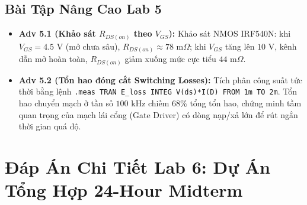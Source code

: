 \documentclass[12pt,a4paper]{report}
\begin{document}
\section{Bài Tập Nâng Cao Lab 5}
\begin{itemize}
    \item \textbf{Adv 5.1 (Khảo sát $R_{DS(on)}$ theo $V_{GS}$):} Khảo sát NMOS IRF540N: khi $V_{GS} = 4.5\text{ V}$ (mở chưa sâu), $R_{DS(on)} \approx 78\text{ m}\Omega$; khi $V_{GS}$ tăng lên $10\text{ V}$, kênh dẫn mở hoàn toàn, $R_{DS(on)}$ giảm xuống mức cực tiểu $44\text{ m}\Omega$.
    \item \textbf{Adv 5.2 (Tổn hao đóng cắt Switching Losses):} Tích phân công suất tức thời bằng lệnh \lstinline|.meas TRAN E_loss INTEG V(ds)*I(D) FROM 1m TO 2m|. Tổn hao chuyển mạch ở tần số $100\text{ kHz}$ chiếm $68\%$ tổng tổn hao, chứng minh tầm quan trọng của mạch lái cổng (Gate Driver) có dòng nạp/xả lớn để rút ngắn thời gian quá độ.
\end{itemize}

\chapter{Đáp Án Chi Tiết Lab 6: Dự Án Tổng Hợp 24-Hour Midterm}
\end{document}
